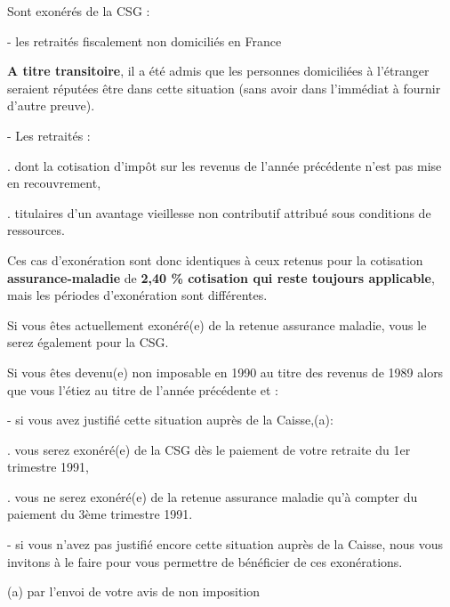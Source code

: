 
Sont exonérés de la CSG :

- les retraités fiscalement non domiciliés en France

\textbf{A titre transitoire}, il a été admis que les personnes domiciliées à l'étranger seraient réputées être dans cette situation (sans avoir dans l'immédiat à fournir d'autre preuve).

- Les retraités :

. dont la cotisation d'impôt sur les revenus de l'année précédente n'est pas mise en recouvrement,

. titulaires d'un avantage vieillesse non contributif attribué sous conditions de ressources.

Ces cas d'exonération sont donc identiques à ceux retenus pour la cotisation \textquotedbl{}\textbf{assurance-maladie}\textquotedbl{} de \textbf{2,40 \% cotisation qui reste toujours applicable}, mais les périodes d'exonération sont différentes.

Si vous êtes actuellement exonéré(e) de la retenue assurance maladie, vous le serez également pour la CSG.

Si vous êtes devenu(e) non imposable en 1990 au titre des revenus de 1989 alors que vous l'étiez au titre de l'année précédente et :

- si vous avez justifié cette situation auprès de la Caisse,(a):

. vous serez exonéré(e) de la CSG dès le paiement de votre retraite du 1er trimestre 1991,

. vous ne serez exonéré(e) de la retenue assurance maladie qu'à compter du paiement du 3ème trimestre 1991.

- si vous n'avez pas justifié encore cette situation auprès de la Caisse, nous vous invitons à le faire pour vous permettre de bénéficier de ces exonérations.


(a) par l'envoi de votre avis de non imposition
